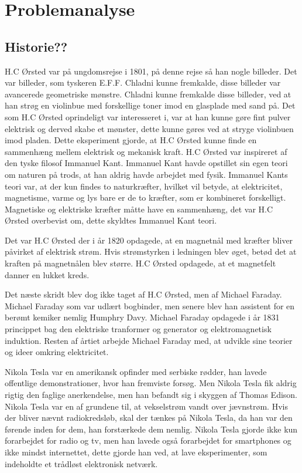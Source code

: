 
\chapter{Problemanalyse}

\section{Historie??}
H.C Ørsted var på ungdomsrejse i 1801, på denne rejse så han nogle billeder. Det var billeder, som tyskeren E.F.F. Chladni kunne fremkalde, disse billeder var avancerede geometriske mønstre. Chladni kunne fremkalde disse billeder, ved at han strøg en violinbue med forskellige toner imod en glasplade med sand på. Det som H.C Ørsted oprindeligt var interesseret i, var at han kunne gøre fint pulver elektrisk og derved skabe et mønster, dette kunne gøres ved at stryge violinbuen imod pladen. Dette eksperiment gjorde, at H.C Ørsted kunne finde en sammenhæng mellem elektrisk og mekanisk kraft. H.C Ørsted var inspireret af den tyske filosof Immanuel Kant. Immanuel Kant havde opstillet sin egen teori om naturen på trods, at han aldrig havde arbejdet med fysik. Immanuel Kants teori var, at der kun findes to naturkræfter, hvilket vil betyde, at elektricitet, magnetisme, varme og lys bare er de to kræfter, som er kombineret forskelligt. Magnetiske og elektriske kræfter måtte have en sammenhæng, det var H.C Ørsted overbevist om, dette skyldtes Immanuel Kant teori. 

Det var H.C Ørsted der i år 1820 opdagede, at en magnetnål med kræfter bliver påvirket af elektrisk strøm. Hvis strømstyrken i ledningen blev øget, betød det at kraften på magnetnålen blev større. H.C Ørsted opdagede, at et magnetfelt danner en lukket kreds. 

Det næste skridt blev dog ikke taget af H.C Ørsted, men af Michael Faraday. Michael Faraday som var udlært bogbinder, men senere blev han assistent for en berømt kemiker nemlig Humphry Davy. Michael Faraday opdagede i år 1831 princippet bag den elektriske tranformer og generator og elektromagnetisk induktion. Resten af årtiet arbejde Michael Faraday med, at udvikle sine teorier og ideer omkring elektricitet. 

Nikola Tesla var en amerikansk opfinder med serbiske rødder, han lavede offentlige demonstrationer, hvor han fremviste forsøg. Men Nikola Tesla fik aldrig rigtig den faglige anerkendelse, men han befandt sig i skyggen af Thomas Edison. Nikola Tesla var en af grundene til, at vekselstrøm vandt over jævnstrøm. Hvis der bliver nævnt radiokredsløb, skal der tænkes på Nikola Tesla, da han var den førende inden for dem, han forstærkede dem nemlig. Nikola Tesla gjorde ikke kun forarbejdet for radio og tv, men han lavede også forarbejdet for smartphones og ikke mindst internettet, dette gjorde han ved, at lave eksperimenter, som indeholdte et trådløst elektronisk netværk.


